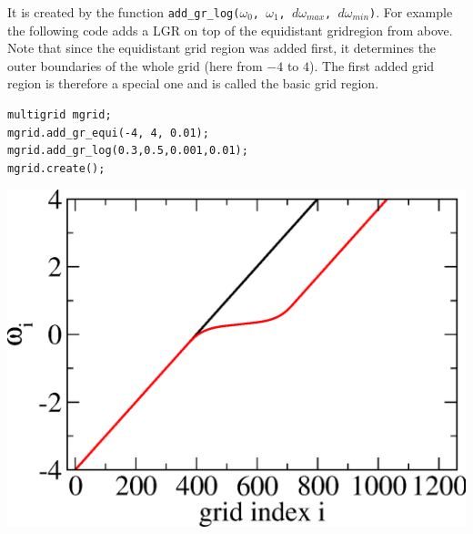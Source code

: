 \documentclass[a4paper]{scrreprt}
\begin{document}
It is created by the function \texttt{add\_gr\_log($\omega_0$, $\omega_1$, $d\omega_{max}$, $d\omega_{min}$)}. For example the following code adds a LGR on top of the equidistant gridregion from above. Note that since the equidistant grid region was added first, it determines the outer boundaries of the whole grid (here from $-4$ to $4$). The first added grid region is therefore a special one and is called the basic grid region.
\\
\vspace{1cm}
\noindent\begin{minipage}[l]{0.6\textwidth}
\begin{lstlisting}
multigrid mgrid;
mgrid.add_gr_equi(-4, 4, 0.01);
mgrid.add_gr_log(0.3,0.5,0.001,0.01);
mgrid.create();
\end{lstlisting}
\end{minipage}
\begin{minipage}[]{0.4\textwidth}
	\includegraphics[width=1.0\textwidth]{pics/multigrid_01.eps}
\end{minipage}
\end{document}
